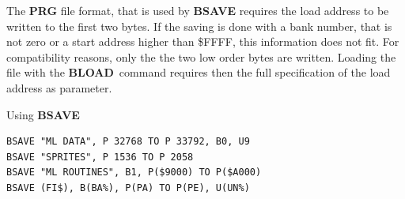 \begin{description}[leftmargin=2cm,style=nextline]
   The {\bf PRG} file format, that is used by {\bf BSAVE}
   requires the load address to be written to the first two bytes.
   If the saving is done with a bank number, that is not zero
   or a start address higher than \$FFFF, this information does not
   fit. For compatibility reasons, only the the two low order bytes
   are written. Loading the file with the {\bf BLOAD} command
   requires then the full specification of the load address as parameter.

\item [Examples:] Using {\bf BSAVE}
\begin{tcolorbox}[colback=black,coltext=white]
\verbatimfont{\codefont}
\begin{verbatim}
BSAVE "ML DATA", P 32768 TO P 33792, B0, U9
BSAVE "SPRITES", P 1536 TO P 2058
BSAVE "ML ROUTINES", B1, P($9000) TO P($A000)
BSAVE (FI$), B(BA%), P(PA) TO P(PE), U(UN%)
\end{verbatim}
\end{tcolorbox}
\end{description}


\newpage

